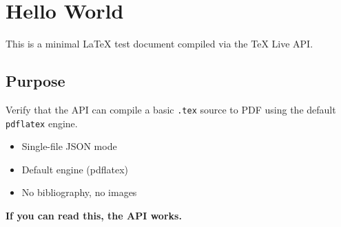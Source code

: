 \documentclass[12pt]{article}
\begin{document}
\section{Hello World}
This is a minimal LaTeX test document compiled via the TeX Live API.

\subsection{Purpose}
Verify that the API can compile a basic \texttt{.tex} source to PDF
using the default \texttt{pdflatex} engine.

\begin{itemize}
  \item Single-file JSON mode
  \item Default engine (pdflatex)
  \item No bibliography, no images
\end{itemize}

\noindent\hrulefill

\textbf{If you can read this, the API works.}
\end{document}
